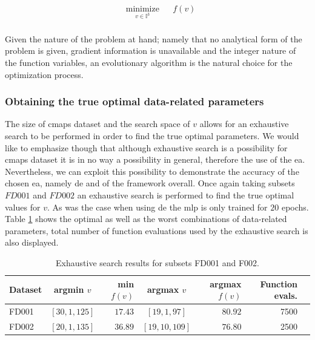 \begin{equation}
\begin{aligned}
& \underset{v \in \mathbb{I}^3}{\text{minimize}}
& & f(v) \\
\end{aligned}
\label{eq:optimization_problem}
\end{equation}

Given the nature of the problem at hand; namely that no analytical form of the problem is given, gradient information is unavailable and the integer nature of the function variables, an evolutionary algorithm is the natural choice for the optimization process.

\subsubsection{Obtaining the true optimal data-related parameters}

The size of \gls{cmaps} dataset and the search space of $v$ allows for an exhaustive search to be performed in order to find the true optimal parameters. We would like to emphasize though that although exhaustive search is a possibility for \gls{cmaps} dataset it is in no way a possibility in general, therefore the use of the \gls{ea}. Nevertheless, we can exploit this possibility to demonstrate the accuracy of the chosen \gls{ea}, namely \gls{de} and of the framework overall. Once again taking subsets $FD001$ and $FD002$ an exhaustive search is performed to find the true optimal values for $v$. As was the case when using \gls{de} the \gls{mlp} is only trained for $20$ epochs. Table \ref{table:true_optimal_data_params} shows the optimal as well as the worst combinations of data-related parameters, total number of function evaluations used by the exhaustive search is also displayed.

\begin{table}[!htb]
\centering
\begin{tabular}{l | c r c r r l}
	\hline
	 Dataset & argmin $v$ & min $f(v)$ & argmax $v$ & argmax $f(v)$ & Function evals.\\
  	\hline
  	FD001 & $\left[ 30, 1, 125 \right]$ & $17.43$ & $\left[ 19, 1, 97 \right]$ & $80.92$ & 7500\\
  	FD002 & $\left[ 20, 1, 135 \right]$ & $36.89$ & $\left[ 19, 10, 109 \right]$ & $76.80$ & 2500\\
  	\hline
\end{tabular}
\caption{Exhaustive search results for subsets FD001 and F002.}
\label{table:true_optimal_data_params}
\end{table}

